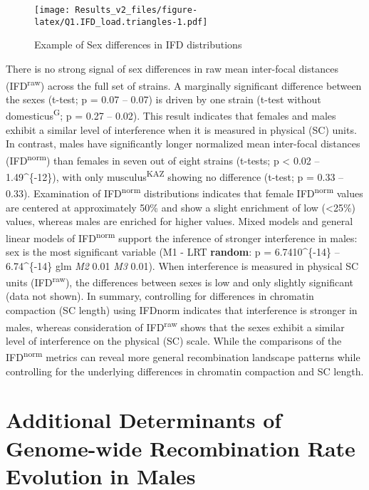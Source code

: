 \documentclass[]{article}
\begin{document}
\begin{figure}
\centering
\texttt{[image: Results\_v2\_files/figure-latex/Q1.IFD\_load.triangles-1.pdf]}
\caption{Example of Sex differences in IFD distributions}
\end{figure}

There is no strong signal of sex differences in raw mean inter-focal
distances (IFD\textsuperscript{raw}) across the full set of strains. A
marginally significant difference between the sexes (t-test; p = 0.07 --
0.07) is driven by one strain (t-test without
domesticus\textsuperscript{G}; p = 0.27 -- 0.02). This result indicates
that females and males exhibit a similar level of interference when it
is measured in physical (SC) units. In contrast, males have
significantly longer normalized mean inter-focal distances
(IFD\textsuperscript{norm}) than females in seven out of eight strains
(t-tests; p \textless{} 0.02 -- 1.49\^{}\{-12\}), with only
musculus\textsuperscript{KAZ} showing no difference (t-test; p = 0.33 --
0.33). Examination of IFD\textsuperscript{norm} distributions indicates
that female IFD\textsuperscript{norm} values are centered at
approximately 50\% and show a slight enrichment of low (\textless{}25\%)
values, whereas males are enriched for higher values. Mixed models and
general linear models of IFD\textsuperscript{norm} support the inference
of stronger interference in males: sex is the most significant variable
(M1 - LRT \textbf{random}: p = 6.7410\^{}\{-14\} --
6.74\^{}\{-14\} glm \emph{M2} 0.01 \emph{M3} 0.01). When
interference is measured in physical SC units
(IFD\textsuperscript{raw}), the differences between sexes is low and
only slightly significant (data not shown). In summary, controlling for
differences in chromatin compaction (SC length) using IFDnorm indicates
that interference is stronger in males, whereas consideration of
IFD\textsuperscript{raw} shows that the sexes exhibit a similar level of
interference on the physical (SC) scale. While the comparisons of the
IFD\textsuperscript{norm} metrics can reveal more general recombination
landscape patterns while controlling for the underlying differences in
chromatin compaction and SC length.

\section{Additional Determinants of Genome-wide Recombination Rate
Evolution in
Males}\label{additional-determinants-of-genome-wide-recombination-rate-evolution-in-males}
\end{document}
